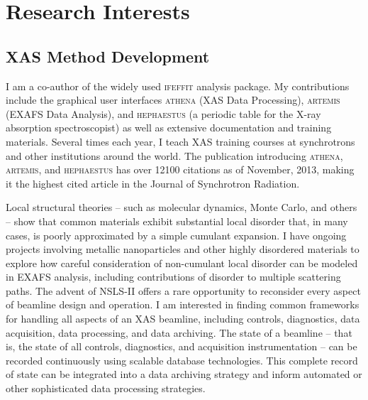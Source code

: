 \documentclass[11pt]{moderncv}
\begin{document}
\section{Research Interests}

\subsection{XAS Method Development}
%
{I am a co-author of the widely used \textsc{ifeffit} analysis
  package.  My contributions include the graphical user interfaces
  \textsc{athena} (XAS Data Processing), \textsc{artemis} (EXAFS Data
  Analysis), and \textsc{hephaestus} (a periodic table for the X-ray
  absorption spectroscopist) as well as extensive documentation and
  training materials.  Several times each year, I teach XAS training
  courses at synchrotrons and other institutions around the
  world. \newline{} The publication introducing \textsc{athena},
  \textsc{artemis}, and \textsc{hephaestus} has over 12100 citations as
  of November, 2013, making it the highest cited article in the Journal
  of Synchrotron Radiation.}

%
{Local structural theories -- such as molecular dynamics, Monte Carlo,
  and others -- show that common materials exhibit substantial local
  disorder that, in many cases, is poorly approximated by a simple
  cumulant expansion.  I have ongoing projects involving metallic
  nanoparticles and other highly disordered materials to explore how
  careful consideration of non-cumulant local disorder can be modeled
  in EXAFS analysis, including contributions of disorder to multiple
  scattering paths.}
%
%
{The advent of NSLS-II offers a rare opportunity to reconsider every
  aspect of beamline design and operation.  I am interested in finding
  common frameworks for handling all aspects of an XAS beamline,
  including controls, diagnostics, data acquisition, data processing,
  and data archiving.  The state of a beamline -- that is, the state
  of all controls, diagnostics, and acquisition instrumentation -- can
  be recorded continuously using scalable database technologies.  This
  complete record of state can be integrated into a data archiving
  strategy and inform automated or other sophisticated data processing
  strategies.}
\end{document}
